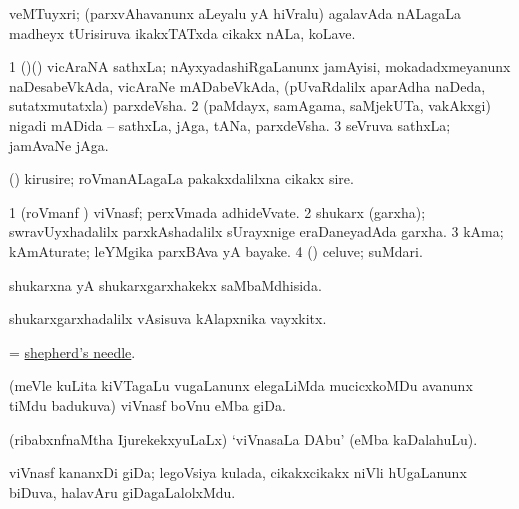 \bentry
{} 
\gl{\nA}
\bmng
 veMTuyxri; (parxvAhavanunx aLeyalu yA hiVralu) agalavAda nALagaLa madheyx tUrisiruva ikakxTATxda cikakx nALa, koLave. 
\emng
\eentry

\bentry
{} 
\gl{\nA}
\expl{}
\bmng
\bnum
\num{1} (\nAyxshA)(\ca) vicAraNA sathxLa; nAyxyadashiRgaLanunx jamAyisi, mokadadxmeyanunx naDesabeVkAda, vicAraNe mADabeVkAda, (pUvaRdalilx aparAdha naDeda, sutatxmutatxla) parxdeVsha. 
\num{2} (paMdayx, samAgama, saMjekUTa, \mo vakAkxgi) nigadi mADida -- sathxLa, jAga, tANa, parxdeVsha. 
\num{3} seVruva sathxLa; jamAvaNe jAga. 
\enum
\emng
\eentry

\bentry
{} 
\gl{\nA}
\expl{}
\bmng
 (\aMrashA) kirusire; roVmanALagaLa pakakxdalilxna cikakx sire. 
\emng
\eentry

\bentry
{} 
\gl{\nA}
\bmng
\bnum
\num{1} (roVmanf \pu) viVnasf; perxVmada adhideVvate. 
\num{2} shukarx (garxha); swravUyxhadalilx parxkAshadalilx sUrayxnige eraDaneyadAda garxha. 
\num{3} kAma; kAmAturate; leYMgika parxBAva yA bayake. 
\num{4} (\kAparx) celuve; suMdari. 
\enum
\emng
\eentry

\bentry
{} 
\gl{\gu}
\expl{}
\bmng
 shukarxna yA shukarxgarxhakekx saMbaMdhisida. 
\emng
\eentry

\bentry
{} 
\gl{\nA}
\expl{}
\bmng
 shukarxgarxhadalilx vAsisuva kAlapxnika vayxkitx. 
\emng
\eentry

\bentry
{} 
\gl{\nA}
\expl{}
\bmng
 = \hyperref{kandict_s.pdf}{S}{shepherd's needle}{shepherd's needle}. 
\emng
\eentry

\bentry
{}
\gl{\nA}
\bmng
 (meVle kuLita kiVTagaLu \mo vugaLanunx elegaLiMda mucicxkoMDu avanunx tiMdu badukuva) viVnasf boVnu eMba giDa.  
\emng
\eentry

\bentry
{}
\gl{\nA}
\expl{}
\bmng
 (ribabxnfnaMtha IjurekekxyuLaLx) `viVnasaLa DAbu' (eMba kaDalahuLu). 
\emng
\eentry

\bentry
{}
\gl{\nA}
\expl{}
\bmng
 viVnasf kananxDi giDa; legoVsiya kulada, cikakxcikakx niVli hUgaLanunx biDuva, halavAru giDagaLalolxMdu. 
\emng
\eentry

